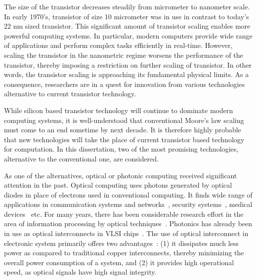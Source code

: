 \documentclass[10pt,letterpaper,twoside,openright]{book}
\begin{document}
The size of the transistor decreases steadily from micrometer to nanometer scale. In early 1970's, transistor of size 10 micrometer was in use in contrast to today's 22 nm sized transistor. This significant amount of transistor scaling enables more powerful computing systems. In particular, modern computers provide wide range of applications and perform complex tasks efficiently in real-time. However, scaling the transistor in the nanometric regime worsens the performance of the transistor, thereby imposing a restriction on further scaling of transistor. In other words, the transistor scaling is approaching its fundamental physical limits. As a consequence, researchers are in a quest for innovation from various technologies alternative to current transistor technology.

While silicon based transistor technology will continue to dominate modern computing systems, it is well-understood that conventional Moore's law scaling must come to an end sometime by next decade. It is therefore highly probable that new technologies will take the place of current transistor based technology for computation. In this dissertation, two of the most promising technologies, alternative to the conventional one, are considered.

As one of the alternatives, optical or photonic computing received significant attention in the past. Optical computing uses photons generated by optical diodes in place of electrons used in conventional computing. It finds wide range of applications in communication systems and networks~\cite{Keiser:1991}, security systems~\cite{Chen:14}, medical devices~\cite{fitch2003medical,dosmann1996medical} etc. For many years, there has been considerable research effort in the area of information processing by optical techniques~\cite{SHLee1981,IIM1986}. Photonics has already been in use as optical interconnects in VLSI chips~\cite{Krish2013}. The use of optical interconnect in electronic system primarily offers two advantages~\cite{OG1992,Feldman:88}: (1) it dissipates much less power as compared to traditional copper interconnects, thereby minimizing the overall power consumption of a system, and (2) it provides high operational speed, as optical signals have high signal integrity. 
\end{document}

